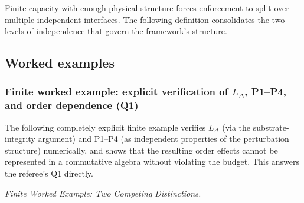 \documentclass[11pt]{article}
\theoremstyle{remark}
\begin{document}
Finite capacity with enough physical structure forces enforcement to split over multiple independent interfaces.  The following definition consolidates the two levels of independence that govern the framework's structure.



\subsection{Worked examples}
\label{sec:examples}

\subsubsection*{Finite worked example: explicit verification of $L_\Delta$, P1--P4, and order dependence (Q1)}
\label{sec:worked_example}

The following completely explicit finite example verifies $L_\Delta$ (via the substrate-integrity argument) and P1--P4 (as independent properties of the perturbation structure)
numerically, and shows that the resulting order effects cannot be represented
in a commutative algebra without violating the budget.  This answers the
referee's Q1 directly.


\medskip\noindent\textit{Finite Worked Example: Two Competing Distinctions.}
\end{document}
